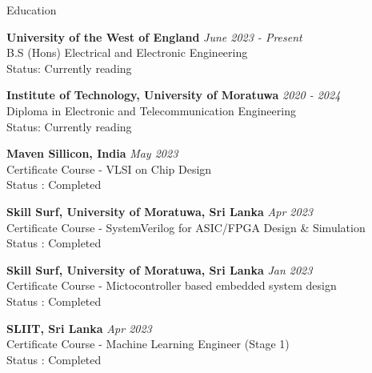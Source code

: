 \documentclass[
	11pt, %
]{./../assets/resume} %
\begin{document}
\begin{rSection}{Education}

	\textbf{University of the West of England} \hfill \textit{June 2023 - Present} \\ 
	B.S (Hons) Electrical and Electronic Engineering \\
	Status: Currently reading

	\textbf{Institute of Technology, University of Moratuwa} \hfill \textit{2020 - 2024} \\ 
	Diploma in Electronic and Telecommunication Engineering \\
	Status: Currently reading
	
	\textbf{Maven Sillicon, India} \hfill \textit{May 2023} \\ 
	Certificate Course - VLSI on Chip Design \\
	Status : Completed

	\textbf{Skill Surf, University of Moratuwa, Sri Lanka} \hfill \textit{Apr 2023} \\ 
	Certificate Course - SystemVerilog for ASIC/FPGA Design \& Simulation \\
	Status : Completed
	
	\textbf{Skill Surf, University of Moratuwa, Sri Lanka} \hfill \textit{Jan 2023} \\ 
	Certificate Course - Mictocontroller based embedded system design \\
	Status : Completed

	\textbf{SLIIT, Sri Lanka} \hfill \textit{Apr 2023} \\ 
	Certificate Course - Machine Learning Engineer (Stage 1) \\
	Status : Completed


\end{rSection}
\end{document}
